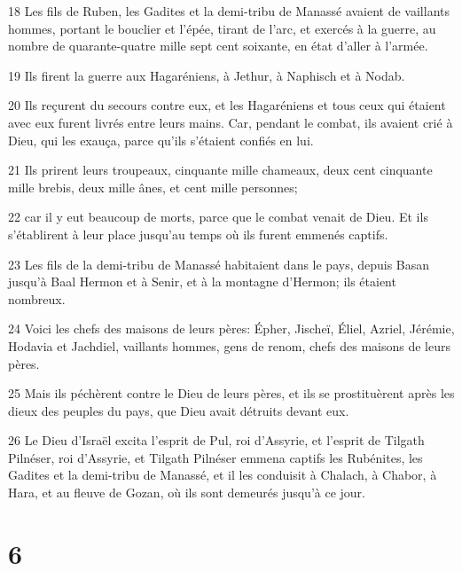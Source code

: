 \par 18 Les fils de Ruben, les Gadites et la demi-tribu de Manassé avaient de vaillants hommes, portant le bouclier et l'épée, tirant de l'arc, et exercés à la guerre, au nombre de quarante-quatre mille sept cent soixante, en état d'aller à l'armée.
\par 19 Ils firent la guerre aux Hagaréniens, à Jethur, à Naphisch et à Nodab.
\par 20 Ils reçurent du secours contre eux, et les Hagaréniens et tous ceux qui étaient avec eux furent livrés entre leurs mains. Car, pendant le combat, ils avaient crié à Dieu, qui les exauça, parce qu'ils s'étaient confiés en lui.
\par 21 Ils prirent leurs troupeaux, cinquante mille chameaux, deux cent cinquante mille brebis, deux mille ânes, et cent mille personnes;
\par 22 car il y eut beaucoup de morts, parce que le combat venait de Dieu. Et ils s'établirent à leur place jusqu'au temps où ils furent emmenés captifs.
\par 23 Les fils de la demi-tribu de Manassé habitaient dans le pays, depuis Basan jusqu'à Baal Hermon et à Senir, et à la montagne d'Hermon; ils étaient nombreux.
\par 24 Voici les chefs des maisons de leurs pères: Épher, Jischeï, Éliel, Azriel, Jérémie, Hodavia et Jachdiel, vaillants hommes, gens de renom, chefs des maisons de leurs pères.
\par 25 Mais ils péchèrent contre le Dieu de leurs pères, et ils se prostituèrent après les dieux des peuples du pays, que Dieu avait détruits devant eux.
\par 26 Le Dieu d'Israël excita l'esprit de Pul, roi d'Assyrie, et l'esprit de Tilgath Pilnéser, roi d'Assyrie, et Tilgath Pilnéser emmena captifs les Rubénites, les Gadites et la demi-tribu de Manassé, et il les conduisit à Chalach, à Chabor, à Hara, et au fleuve de Gozan, où ils sont demeurés jusqu'à ce jour.

\chapter{6}

